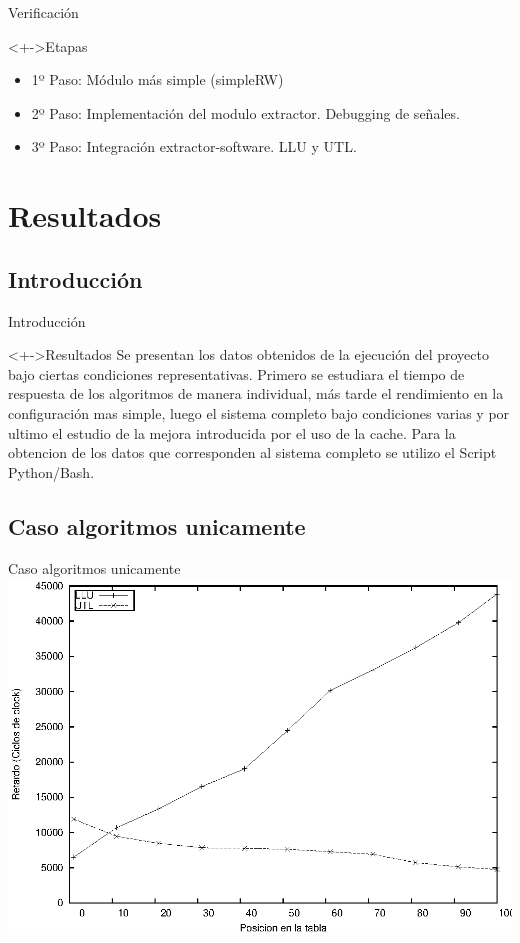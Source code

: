 \documentclass[xcolor=dvipsnames]{beamer}
\begin{document}
\begin{frame}{Verificación}
\begin{block}<+->{Etapas}   
    \begin{itemize}
      \scriptsize
     	\item 1º Paso: Módulo más simple (simpleRW)
     	\item 2º Paso: Implementación del modulo extractor. Debugging de señales.
     	\item 3º Paso: Integración extractor-software. LLU y UTL.
    \end{itemize}
  \end{block}
\end{frame}

\section{Resultados}
\subsection{Introducción}
\begin{frame}{Introducción}
	  \begin{block}<+->{Resultados}  
	\center 
	Se presentan los datos obtenidos de la ejecución del proyecto bajo ciertas condiciones representativas. Primero se estudiara el tiempo de 	respuesta de los algoritmos de manera individual, más tarde el rendimiento en la configuración mas simple, luego el sistema completo bajo condiciones 	varias y por ultimo el estudio de la mejora introducida por el uso de la cache. Para la obtencion de los datos que corresponden al sistema completo se utilizo el Script Python/Bash.
  \end{block}

\end{frame}

\subsection{Caso algoritmos unicamente}
\begin{frame}{Caso algoritmos unicamente} 
\center	
\includegraphics[scale=0.70]{figures/llu-utlsof.eps} 
\end{frame}
\end{document}
